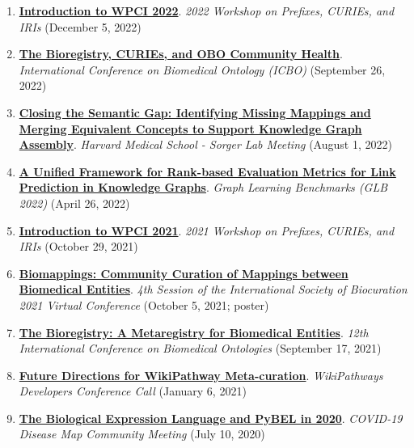 \documentclass[10pt,a4paper,sans]{moderncv} %
\begin{document}
\begin{enumerate}
    \item \textbf{\href{https://docs.google.com/presentation/d/1Vq-tdq_PYSmKydKXEABElgt3oqYs_ridquHDLeUFL1A/edit?usp=sharing}{Introduction to WPCI 2022}}. \textit{2022 Workshop on Prefixes, CURIEs, and IRIs} (December 5, 2022)

    \item \textbf{\href{https://bit.ly/icbo2022-cth}{The Bioregistry, CURIEs, and OBO Community Health}}. \textit{International Conference on Biomedical Ontology (ICBO)} (September 26, 2022)

    \item \textbf{\href{https://bit.ly/sorger-lab-biomappings}{Closing the Semantic Gap: Identifying Missing Mappings and Merging Equivalent Concepts to Support Knowledge Graph Assembly}}. \textit{Harvard Medical School - Sorger Lab Meeting} (August 1, 2022)

    \item \textbf{\href{https://bit.ly/glb2022-ranking-metrics}{A Unified Framework for Rank-based Evaluation Metrics for Link Prediction in Knowledge Graphs}}. \textit{Graph Learning Benchmarks (GLB 2022)} (April 26, 2022)

    \item \textbf{\href{https://bit.ly/WPCI2021}{Introduction to WPCI 2021}}. \textit{2021 Workshop on Prefixes, CURIEs, and IRIs} (October 29, 2021)

    \item \textbf{\href{https://f1000research.com/posters/10-1005}{Biomappings: Community Curation of Mappings between Biomedical Entities}}. \textit{4th Session of the International Society of Biocuration 2021 Virtual Conference} (October 5, 2021; poster)

    \item \textbf{\href{https://www.youtube.com/watch?v=9Pf5wr8JxCQ&t=1s}{The Bioregistry: A Metaregistry for Biomedical Entities}}. \textit{12th International Conference on Biomedical Ontologies} (September 17, 2021)

    \item \textbf{\href{https://docs.google.com/presentation/d/1C8T3XVOL8GiZ68WBXXSnI3SVjhd2aSBuVLXVPPGqKTw/edit?usp=sharing}{Future Directions for WikiPathway Meta-curation}}. \textit{WikiPathways Developers Conference Call} (January 6, 2021)

    \item \textbf{\href{https://docs.google.com/presentation/d/18ntRMvO3Q9KTX87xoLOIgqAW3iiUvxJsfEmaFh1-52A/edit?usp=sharing}{The Biological Expression Language and PyBEL in 2020}}. \textit{COVID-19 Disease Map Community Meeting} (July 10, 2020)


\end{enumerate}
\end{document}
